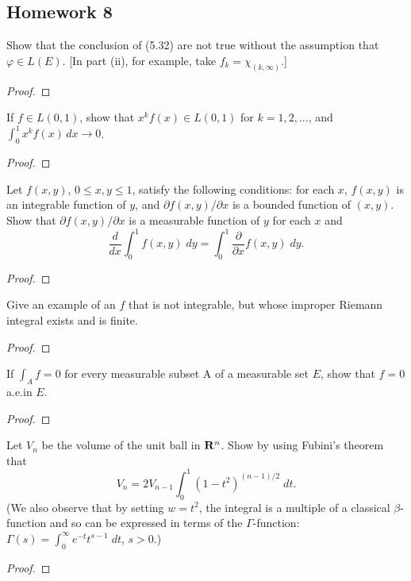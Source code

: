 \subsection{Homework 8}
\begin{problem}
Show that the conclusion of (5.32) are not true without the assumption that
$\varphi\in L(E)$. [In part (ii), for example, take $f_k=\chi_{(k,\infty)}$.]
\end{problem}
\begin{proof}
\end{proof}

\begin{problem}
If $f\in L(0,1)$, show that $x^kf(x)\in L(0,1)$ for $k=1,2,...$, and
$\int_0^1 x^kf(x)\,dx\to 0$.
\end{problem}
\begin{proof}
\end{proof}

\begin{problem}
Let $f(x,y)$, $0\leq x,y\leq 1$, satisfy the following conditions: for each
$x$, $f(x,y)$ is an integrable function of $y$, and
$\partial f(x,y)/\partial x$ is a bounded function of $(x,y)$. Show that
$\partial f(x,y)/\partial x$ is a measurable function of $y$ for each $x$
and
\[
\frac{d}{dx}\int_0^1f(x,y)\;dy=\int_0^1\frac{\partial}{\partial x}f(x,y)\;dy.
\]
\end{problem}
\begin{proof}
\end{proof}

\begin{problem}
Give an example of an $f$ that is not integrable, but whose improper
Riemann integral exists and is finite.
\end{problem}
\begin{proof}
\end{proof}

\begin{problem}
If $\int_A f=0$ for every measurable subset A of a measurable set $E$, show
that $f=0$ a.e.\@ in $E$.
\end{problem}
\begin{proof}
\end{proof}

\begin{problem}
 Let $V_n$ be the volume of the unit ball in $\mathbf{R}^n$. Show by using
 Fubini's theorem that
\[
V_n=2V_{n-1}\int_0^1\left(1-t^2\right)^{(n-1)/2}\;dt.
\]
(We also observe that by setting $w=t^2$, the integral is a multiple of a
classical $\beta$-function and so can be expressed in terms of the
$\Gamma$-function: $\Gamma(s)=\int_0^\infty e^{-t}t^{s-1}\;dt$, $s>0$.)
\end{problem}
\begin{proof}
\end{proof}

